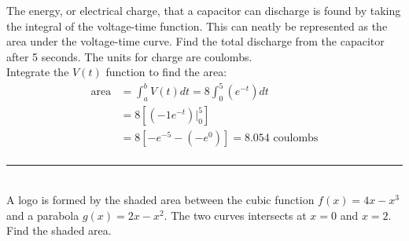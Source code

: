 \begin{multicols}{2}
The energy, or electrical charge, that a capacitor can discharge is found by taking the integral of the voltage-time function. This can neatly be represented as the area under the voltage-time curve. Find the total discharge from the capacitor after 5 seconds. The units for charge are coulombs.\\
\solution Integrate the $V(t)$ function to find the area:\\
	\begin{align*}
\mathrm{area}&=\int_{a}^{b}V(t)dt=8\int_{0}^{5}\left(e^{-t}\right)dt\\
&=8\left[\left(-1e^{-t}\right)\Big|_{0}^5\right]\\
&=8\left[-e^{-5}-(-e^{0})\right]=8.054 \,\, \text{coulombs}\\
\end{align*}
\columnbreak
\begin{center}
\end{center}
\end{multicols}
\rule{6.8cm}{0.5pt}\\
\example A logo is formed by the shaded area between the cubic function  $ f(x)=4x -x^3$ and a parabola $g(x)=2x-x^2$. The two curves intersects at $x=0$ and $x=2$. Find the shaded area.\\
